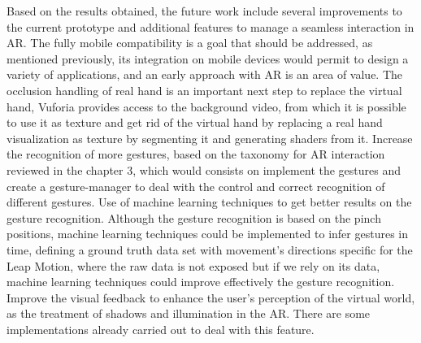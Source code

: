 Based on the results obtained, the future work include several improvements to the current prototype and additional features to manage a seamless interaction in AR. The fully mobile compatibility is a goal that should be addressed, as mentioned previously, its integration on mobile devices would permit to design a variety of applications, and an early approach with AR is an area of value. The occlusion handling of real hand is an important next step to replace the virtual hand, Vuforia provides access to the background video, from which it is possible to use it as texture and get rid of the virtual hand by replacing a real hand visualization as texture by segmenting it and generating shaders from it. Increase the recognition of more gestures, based on the taxonomy for AR interaction reviewed in the chapter 3, which would consists on implement the gestures and create a gesture-manager to deal with the control and correct recognition of different gestures. Use of machine learning techniques to get better results on the gesture recognition. Although the gesture recognition is based on the pinch positions, machine learning techniques could be implemented to infer gestures in time, defining a ground truth data set with movement’s directions specific for the Leap Motion, where the raw data is not exposed but if we rely on its data, machine learning techniques could improve effectively the gesture recognition. Improve the visual feedback to enhance the user’s perception of the virtual world, as the treatment of shadows and illumination in the AR. There are some implementations already carried out to deal with this feature.


